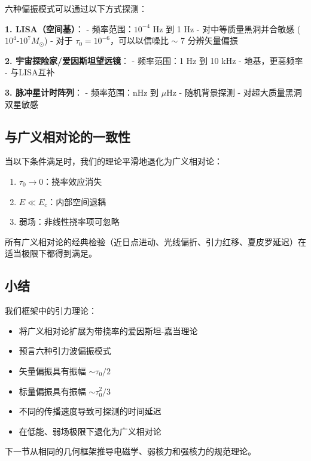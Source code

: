 六种偏振模式可以通过以下方式探测：

\textbf{1. LISA（空间基）}：
- 频率范围：$10^{-4}$ Hz 到 1 Hz
- 对中等质量黑洞并合敏感 ($10^4$-$10^7 M_\odot$)
- 对于 $\tau_0 = 10^{-6}$，可以以信噪比 $\sim$ 7 分辨矢量偏振

\textbf{2. 宇宙探险家/爱因斯坦望远镜}：
- 频率范围：1 Hz 到 10 kHz
- 地基，更高频率
- 与LISA互补

\textbf{3. 脉冲星计时阵列}：
- 频率范围：nHz 到 $\mu$Hz
- 随机背景探测
- 对超大质量黑洞双星敏感

\subsection{与广义相对论的一致性}

当以下条件满足时，我们的理论平滑地退化为广义相对论：
\begin{enumerate}
    \item $\tau_0 \to 0$：挠率效应消失
    \item $E \ll E_c$：内部空间退耦
    \item 弱场：非线性挠率项可忽略
\end{enumerate}

所有广义相对论的经典检验（近日点进动、光线偏折、引力红移、夏皮罗延迟）在适当极限下都得到满足。

\subsection{小结}

我们框架中的引力理论：
\begin{itemize}
    \item 将广义相对论扩展为带挠率的爱因斯坦-嘉当理论
    \item 预言六种引力波偏振模式
    \item 矢量偏振具有振幅 $\sim \tau_0/2$
    \item 标量偏振具有振幅 $\sim \tau_0^2/3$
    \item 不同的传播速度导致可探测的时间延迟
    \item 在低能、弱场极限下退化为广义相对论
\end{itemize}

下一节从相同的几何框架推导电磁学、弱核力和强核力的规范理论。
